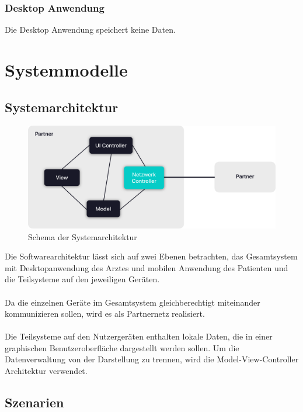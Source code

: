 \documentclass[a4paper]{scrreprt}
\begin{document}
\subsection{\gls{Desktop Anwendung}}
Die \gls{Desktop Anwendung} speichert keine Daten.


\chapter{Systemmodelle}
\section{Systemarchitektur}
\begin{figure}[ht]
  \centering
  \includegraphics[width=1\textwidth]{graphics/Systemarchitektur}
  \caption{Schema der Systemarchitektur}
\end{figure}
Die Softwarearchitektur lässt sich auf zwei Ebenen betrachten, das Gesamtsystem mit Desktopanwendung des Arztes und mobilen Anwendung des Patienten und die Teilsysteme auf den jeweiligen Geräten. \\\\
Da die einzelnen Geräte im Gesamtsystem gleichberechtigt miteinander kommunizieren sollen, wird es als Partnernetz realisiert.\\\\
Die Teilsysteme auf den Nutzergeräten enthalten lokale Daten, die in einer graphischen Benutzeroberfläche dargestellt werden sollen. Um die Datenverwaltung von der Darstellung zu trennen, wird die Model-View-Controller Architektur verwendet.

\section{Szenarien}
\end{document}
